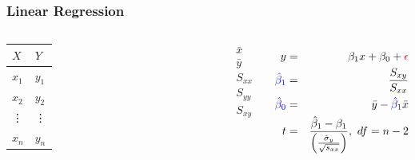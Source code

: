 \begin{frame}
  \frametitle{Linear Regression}

    \begin{columns}

      \begin{tabular}{l|l}
        $X$    & $Y$ \\ \hline
        $x_1$  & $y_1$  \\
        $x_2$  & $y_2$  \\
        \vdots & \vdots  \\
        $x_n$  & $y_n$
      \end{tabular}


      \begin{eqnarray*}
        \bar{x} \\
        \bar{y} \\
        S_{xx} \\
        S_{yy} \\
        S_{xy} 
        \end{eqnarray*}

      
      \begin{eqnarray*}
        y & = & \beta_1 x + \beta_0 + {\color{red}\epsilon} \\
        {\color{blue}\hat{\beta}_1} & = & \frac{S_{xy}}{S_{xx}} \\
        {\color{blue}\hat{\beta}_0} & = & \bar{y} - {\color{blue}\hat{\beta}_1} \bar{x} \\
        t & = & \frac{\hat{\beta}_1-\beta_1}{\left(\frac{\hat{\sigma}_y}{\sqrt{s_{xx}}}\right)},~df=n-2
      \end{eqnarray*}

    \end{columns}





\end{frame}

